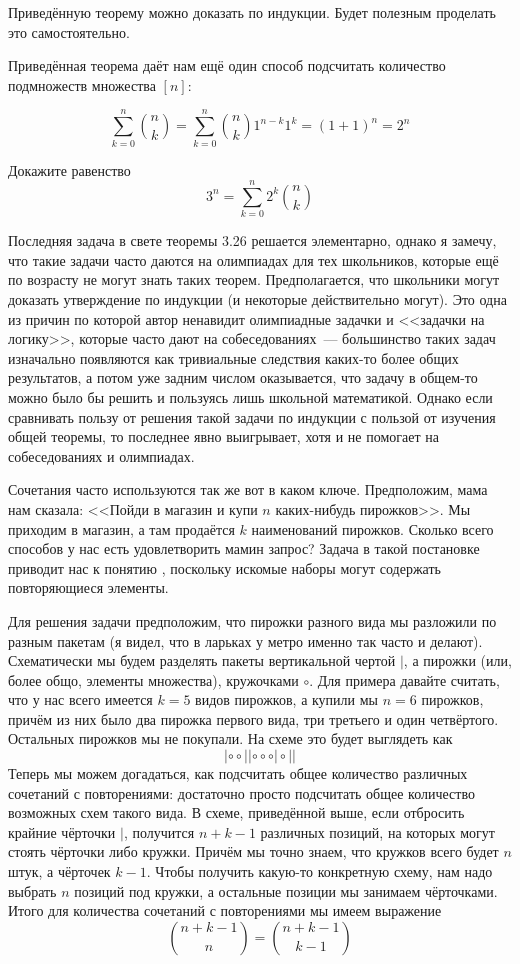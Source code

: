 \begin{exercise}
Приведённую теорему можно доказать по индукции. Будет полезным проделать это самостоятельно.
\end{exercise}

Приведённая теорема даёт нам ещё один способ подсчитать количество подмножеств множества $[n]$:

$$\sum_{k=0}^n {n \choose k} = \sum_{k=0}^n {n \choose k}1^{n-k}1^k = (1+1)^n = 2^n$$

\begin{exercise}
Докажите равенство
$$3^n = \sum_{k=0}^{n} 2^k {n \choose k}$$
\end{exercise}

Последняя задача в свете теоремы 3.26 решается элементарно, однако я замечу, что такие задачи часто даются на олимпиадах для тех школьников, которые ещё по возрасту не могут знать таких теорем. Предполагается, что школьники могут доказать утверждение по индукции (и некоторые действительно могут). Это одна из причин по которой автор ненавидит олимпиадные задачки и <<задачки на логику>>, которые часто дают на собеседованиях~--- большинство таких задач изначально появляются как тривиальные следствия каких-то более общих результатов, а потом уже задним числом оказывается, что задачу в общем-то можно было бы решить и пользуясь лишь школьной математикой. Однако если сравнивать пользу от решения такой задачи по индукции с пользой от изучения общей теоремы, то последнее явно выигрывает, хотя и не помогает на собеседованиях и олимпиадах.

Сочетания часто используются так же вот в каком ключе. Предположим, мама нам сказала: <<Пойди в магазин и купи $n$ каких-нибудь пирожков>>. Мы приходим в магазин, а там продаётся $k$ наименований пирожков. Сколько всего способов у нас есть удовлетворить мамин запрос? Задача в такой постановке приводит нас к понятию , поскольку искомые наборы могут содержать повторяющиеся элементы.

Для решения задачи предположим, что пирожки разного вида мы разложили по разным пакетам (я видел, что в ларьках у метро именно так часто и делают). Схематически мы будем разделять пакеты вертикальной чертой $|$, а пирожки (или, более общо, элементы множества), кружочками $\circ$. Для примера давайте считать, что у нас всего имеется $k=5$ видов пирожков, а купили мы $n=6$ пирожков, причём из них было два пирожка первого вида, три третьего и один четвёртого. Остальных пирожков мы не покупали. На схеме это будет выглядеть как
$$|\circ\circ||\circ\circ\circ|\circ||$$
Теперь мы можем догадаться, как подсчитать общее количество различных сочетаний с повторениями: достаточно просто подсчитать общее количество возможных схем такого вида. В схеме, приведённой выше, если отбросить крайние чёрточки $|$, получится $n+k-1$ различных позиций, на которых могут стоять чёрточки либо кружки. Причём мы точно знаем, что кружков всего будет $n$ штук, а чёрточек $k-1$. Чтобы получить какую-то конкретную схему, нам надо выбрать $n$ позиций под кружки, а остальные позиции мы занимаем чёрточками. Итого для количества сочетаний с повторениями мы имеем выражение
$${n+k-1 \choose n} = {n+k-1\choose k - 1}$$

